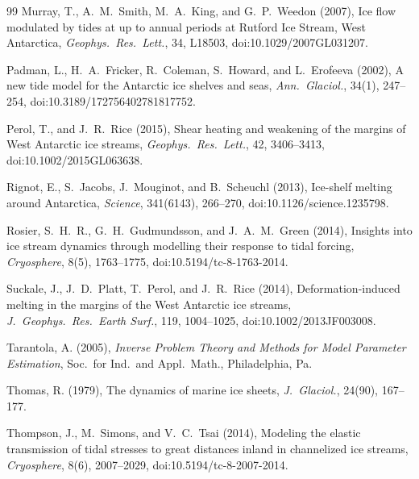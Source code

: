 \documentclass[11pt,letterpaper]{article}
\begin{document}
\begin{thebibliography}{99}
Murray, T., A.~M.~Smith, M.~A.~King, and G.~P.~Weedon (2007),
Ice flow modulated by tides at up to annual periods at {R}utford {I}ce {S}tream, {W}est {A}ntarctica,
\textit{Geophys.\ Res.\ Lett.}, 34, L18503, doi:10.1029/2007GL031207.

Padman, L., H.~A.~Fricker, R.~Coleman, S.~Howard, and L.~Erofeeva (2002),
A new tide model for the {A}ntarctic ice shelves and seas,
\textit{Ann.\ Glaciol.}, 34(1), 247--254, doi:10.3189/172756402781817752.

Perol, T., and J.~R.~Rice (2015),
Shear heating and weakening of the margins of {W}est {A}ntarctic ice streams,
\textit{Geophys.\ Res.\ Lett.}, 42, 3406--3413, doi:10.1002/2015GL063638.

Rignot, E., S.~Jacobs, J.~Mouginot, and B.~Scheuchl (2013),
Ice-shelf melting around {A}ntarctica,
\textit{Science}, 341(6143), 266--270, doi:10.1126/science.1235798.

Rosier, S.~H.~R., G.~H.~Gudmundsson, and J.~A.~M.~Green (2014),
Insights into ice stream dynamics through modelling their response to tidal forcing,
\textit{Cryosphere}, 8(5), 1763--1775, doi:10.5194/tc-8-1763-2014.

Suckale, J., J.~D.~Platt, T.~Perol, and J.~R.~Rice (2014),
Deformation-induced melting in the margins of the {W}est {A}ntarctic ice streams,
\textit{J.\ Geophys.\ Res.\ Earth Surf.}, 119, 1004--1025, doi:10.1002/2013JF003008.

Tarantola, A. (2005),
\textit{Inverse Problem Theory and Methods for Model Parameter Estimation},
Soc.\ for Ind.\ and Appl.\ Math., Philadelphia, Pa.

Thomas, R. (1979),
The dynamics of marine ice sheets,
\textit{J.\ Glaciol.}, 24(90), 167--177.

Thompson, J., M.~Simons, and V.~C.~Tsai (2014),
Modeling the elastic transmission of tidal stresses to great distances inland in channelized ice streams,
\textit{Cryosphere}, 8(6), 2007--2029, doi:10.5194/tc-8-2007-2014.

\end{thebibliography}
\end{document}
